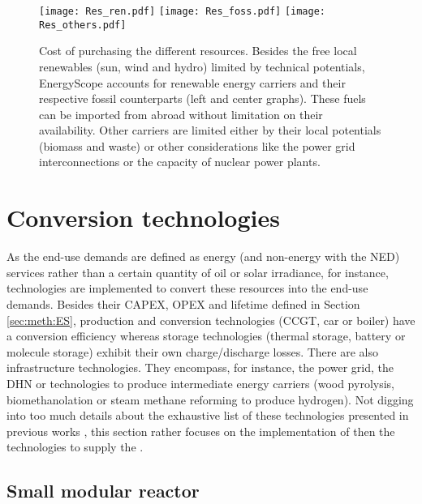 \begin{figure}[htbp!]
\centering

\texttt{[image: Res\_ren.pdf]}
\texttt{[image: Res\_foss.pdf]}
\texttt{[image: Res\_others.pdf]}
\caption{Cost of purchasing the different resources. Besides the free local renewables (\ie sun, wind and hydro) limited by technical potentials, EnergyScope accounts for renewable energy carriers and their respective fossil counterparts (left and center graphs). These fuels can be imported from abroad without limitation on their availability. Other carriers are limited either by their local potentials (\ie biomass and waste) or other considerations like the power grid interconnections or the capacity of nuclear power plants.}
\label{fig:cs_resources_cost}
\end{figure}


\section{Conversion technologies}
\label{sec:cs:technologies}
As the end-use demands are defined as energy (and non-energy with the \gls{NED}) services rather than a certain quantity of oil or solar irradiance, for instance, technologies are implemented to convert these resources into the end-use demands. Besides their CAPEX, OPEX and lifetime defined in Section \ref{sec:meth:ES}, production and conversion technologies (\ie \gls{CCGT}, car or boiler) have a conversion efficiency whereas storage technologies (\ie thermal storage, battery or molecule storage) exhibit their own charge/discharge losses. There are also infrastructure technologies. They encompass, for instance, the power grid, the \gls{DHN} or technologies to produce intermediate energy carriers (\eg wood pyrolysis, biomethanolation or steam methane reforming to produce hydrogen). Not digging into too much details about the exhaustive list of these technologies presented in previous works \cite{limpens2021generating}, this section rather focuses on the implementation of  then the technologies to supply the .\\

\subsection{Small modular reactor}
\label{subsec:cs:SMR_tech}

